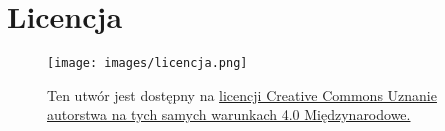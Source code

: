 \section*{Licencja}
\begin{figure}[h]
	\begin{minipage}[c]{0.25\textwidth}
		\texttt{[image: images/licencja.png]}
	\end{minipage}\hfill
	\begin{minipage}[c]{0.75\textwidth}
		\caption*{
			Ten utwór jest dostępny na
			\href{https://creativecommons.org/licenses/by-sa/4.0/}{licencji Creative Commons Uznanie autorstwa
				na tych samych warunkach 4.0 Międzynarodowe.}
		}
	\end{minipage}
\end{figure}